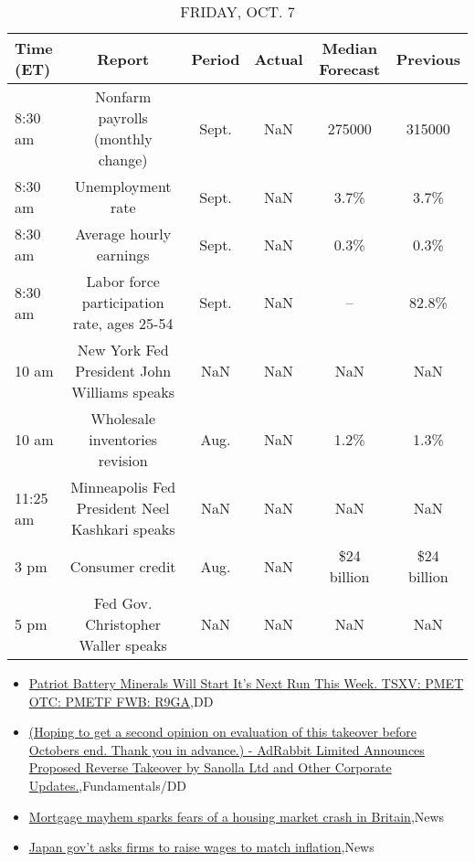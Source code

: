 \documentclass{article}%
\begin{document}
%


\begin{table}[htbp]%
\caption{FRIDAY, OCT. 7}%
\centering%
\begin{adjustbox}{width=1\textwidth}%
\begin{tabular}{lccccc}
\toprule
Time (ET) &                                         Report & Period & Actual & Median Forecast &    Previous \\
\midrule
  8:30 am &              Nonfarm payrolls (monthly change) &  Sept. &    NaN &          275000 &      315000 \\
  8:30 am &                              Unemployment rate &  Sept. &    NaN &            3.7\% &        3.7\% \\
  8:30 am &                        Average hourly earnings &  Sept. &    NaN &            0.3\% &        0.3\% \\
  8:30 am &     Labor force participation rate, ages 25-54 &  Sept. &    NaN &              -- &       82.8\% \\
    10 am &    New York Fed President John Williams speaks &    NaN &    NaN &             NaN &         NaN \\
    10 am &                 Wholesale inventories revision &   Aug. &    NaN &            1.2\% &        1.3\% \\
 11:25 am & Minneapolis Fed President Neel Kashkari speaks &    NaN &    NaN &             NaN &         NaN \\
     3 pm &                                Consumer credit &   Aug. &    NaN &     \$24 billion & \$24 billion \\
     5 pm &             Fed Gov. Christopher Waller speaks &    NaN &    NaN &             NaN &         NaN \\
\bottomrule
\end{tabular}
%
\end{adjustbox}%
\end{table}

%
\begin{itemize}%
\item%
\href{https://reddit.com/r/Baystreetbets/comments/xva3vb/patriot\_battery\_minerals\_will\_start\_its\_next\_run/}{Patriot Battery Minerals Will Start It's Next Run This Week. TSXV: PMET OTC: PMETF FWB: R9GA},DD%
\item%
\href{https://reddit.com/r/StockMarket/comments/xvez5u/hoping\_to\_get\_a\_second\_opinion\_on\_evaluation\_of/}{(Hoping to get a second opinion on evaluation of this takeover before Octobers end. Thank you in advance.) - AdRabbit Limited Announces Proposed Reverse Takeover by Sanolla Ltd and Other Corporate Updates.},Fundamentals/DD%
\item%
\href{https://reddit.com/r/Economics/comments/xvbb8j/mortgage\_mayhem\_sparks\_fears\_of\_a\_housing\_market/}{Mortgage mayhem sparks fears of a housing market crash in Britain},News%
\item%
\href{https://reddit.com/r/Economics/comments/xvawql/japan\_govt\_asks\_firms\_to\_raise\_wages\_to\_match/}{Japan gov't asks firms to raise wages to match inflation},News%
\end{itemize}%
\end{document}
